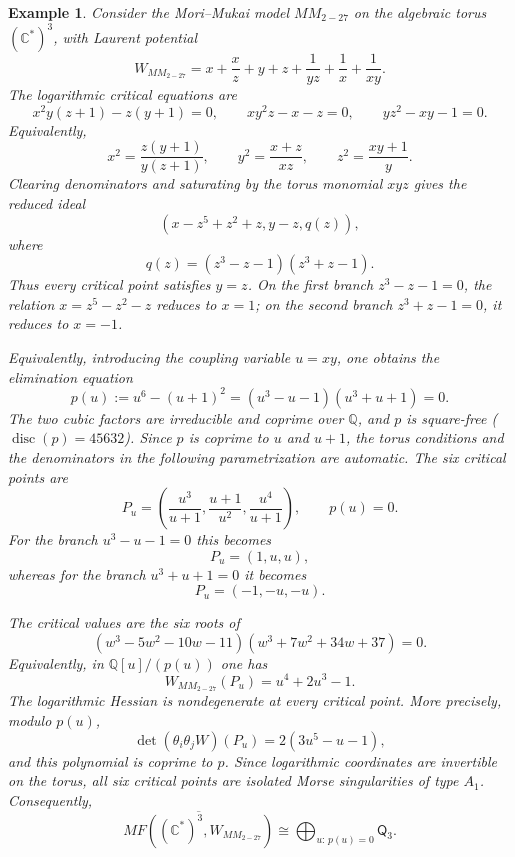 \documentclass[11pt]{amsart}
\newtheorem{example}{Example}[section]
\newcommand{\MorseCat}[1]{\mathsf{Q}_{#1}}
\begin{document}
\begin{example}
Consider the Mori--Mukai model $MM_{2-27}$ on the algebraic torus
$(\mathbb{C}^*)^3$, with Laurent potential
\[
W_{MM_{2-27}}=x+\frac{x}{z}+y+z+\frac{1}{yz}
+\frac{1}{x}+\frac{1}{xy}.
\]
The logarithmic critical equations are
\[
x^2y(z+1)-z(y+1)=0,
\qquad
xy^2z-x-z=0,
\qquad
yz^2-xy-1=0.
\]
Equivalently,
\[
x^2=\frac{z(y+1)}{y(z+1)},
\qquad
y^2=\frac{x+z}{xz},
\qquad
z^2=\frac{xy+1}{y}.
\]
Clearing denominators and saturating by the torus monomial $xyz$ gives the
reduced ideal
\[
\left(
x-z^5+z^2+z,
y-z,
q(z)
\right),
\]
where
\[
q(z)=(z^3-z-1)(z^3+z-1).
\]
Thus every critical point satisfies $y=z$. On the first branch
$z^3-z-1=0$, the relation $x=z^5-z^2-z$ reduces to $x=1$; on the second
branch $z^3+z-1=0$, it reduces to $x=-1$.

Equivalently, introducing the coupling variable $u=xy$, one obtains the
elimination equation
\[
p(u):=u^6-(u+1)^2=(u^3-u-1)(u^3+u+1)=0.
\]
The two cubic factors are irreducible and coprime over $\mathbb{Q}$, and $p$
is square-free ($\operatorname{disc}(p)=45632$). Since $p$ is coprime to $u$
and $u+1$, the torus conditions and the denominators in the following
parametrization are automatic. The six critical points are
\[
P_u=\left(
\frac{u^3}{u+1},
\frac{u+1}{u^2},
\frac{u^4}{u+1}
\right),
\qquad
p(u)=0.
\]
For the branch $u^3-u-1=0$ this becomes
\[
P_u=(1,u,u),
\]
whereas for the branch $u^3+u+1=0$ it becomes
\[
P_u=(-1,-u,-u).
\]

The critical values are the six roots of
\[
(w^3-5w^2-10w-11)(w^3+7w^2+34w+37)=0.
\]
Equivalently, in $\mathbb{Q}[u]/(p(u))$ one has
\[
W_{MM_{2-27}}(P_u)=u^4+2u^3-1.
\]
The logarithmic Hessian is nondegenerate at every critical point. More
precisely, modulo $p(u)$,
\[
\det(\theta_i\theta_jW)(P_u)=2(3u^5-u-1),
\]
and this polynomial is coprime to $p$. Since logarithmic coordinates are
invertible on the torus, all six critical points are isolated Morse
singularities of type $A_1$. Consequently,
\[
\overline{MF((\mathbb{C}^*)^3,W_{MM_{2-27}})}
\cong \bigoplus_{u:\,p(u)=0}\MorseCat{3}.
\]
\end{example}
\end{document}
